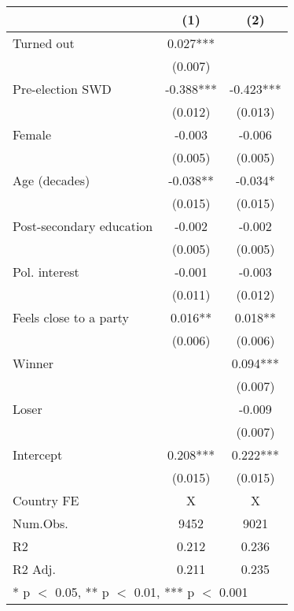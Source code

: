 \begin{table}
\centering
\begin{tabular}[t]{lcc}
\toprule
  & (1) & (2)\\
\midrule
Turned out & 0.027*** & \\
 & (0.007) & \\
Pre-election SWD & -0.388*** & -0.423***\\
 & (0.012) & (0.013)\\
Female & -0.003 & -0.006\\
 & (0.005) & \vphantom{1} (0.005)\\
Age (decades) & -0.038** & -0.034*\\
 & (0.015) & \vphantom{1} (0.015)\\
Post-secondary education & -0.002 & -0.002\\
 & (0.005) & (0.005)\\
Pol. interest & -0.001 & -0.003\\
 & (0.011) & (0.012)\\
Feels close to a party & 0.016** & 0.018**\\
 & (0.006) & (0.006)\\
Winner &  & 0.094***\\
 &  & \vphantom{1} (0.007)\\
Loser &  & -0.009\\
 &  & (0.007)\\
Intercept & 0.208*** & 0.222***\\
 & (0.015) & (0.015)\\
\midrule
Country FE & X & X\\
Num.Obs. & 9452 & 9021\\
R2 & 0.212 & 0.236\\
R2 Adj. & 0.211 & 0.235\\
\bottomrule
\multicolumn{3}{l}{\rule{0pt}{1em}* p $<$ 0.05, ** p $<$ 0.01, *** p $<$ 0.001}\\
\end{tabular}
\end{table}
